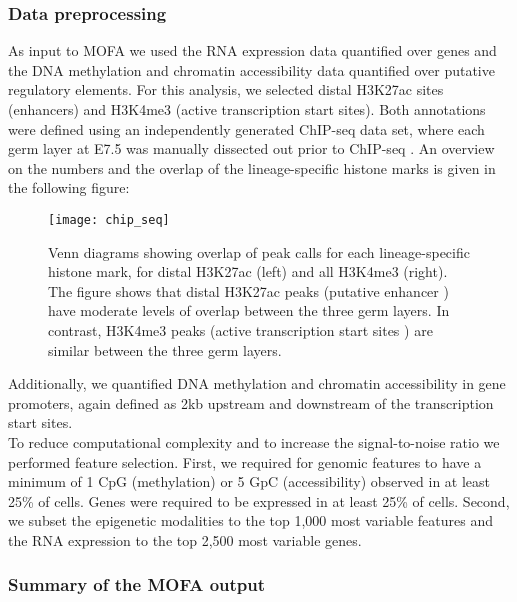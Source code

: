 \subsubsection{Data preprocessing}

As input to MOFA we used the RNA expression data quantified over genes and the DNA methylation and chromatin accessibility data quantified over putative regulatory elements. For this analysis, we selected distal H3K27ac sites (enhancers) and H3K4me3 (active transcription start sites). Both annotations were defined using an independently generated ChIP-seq data set, where each germ layer at E7.5 was manually dissected out prior to ChIP-seq \cite{Xiang2020}. An overview on the numbers and the overlap of the lineage-specific histone marks is given in the following figure:

\begin{figure}[H]
	\texttt{[image: chip\_seq]}
	\caption{
	Venn diagrams showing overlap of peak calls for each lineage-specific histone mark, for distal H3K27ac (left) and all H3K4me3 (right). The figure shows that distal H3K27ac peaks (putative enhancer \cite{Creyghton2010}) have moderate levels of overlap between the three germ layers. In contrast, H3K4me3 peaks (active transcription start sites \cite{Liang2004}) are similar between the three germ layers.
	}
	\label{fig:chip_seq}
\end{figure}

Additionally, we quantified DNA methylation and chromatin accessibility in gene promoters, again defined as 2kb upstream and downstream of the transcription start sites.\\
To reduce computational complexity and to increase the signal-to-noise ratio we performed feature selection. First, we required for genomic features to have a minimum of 1 CpG (methylation) or 5 GpC (accessibility) observed in at least 25\% of cells. Genes were required to be expressed in at least 25\% of cells. Second, we subset the epigenetic modalities to the top 1,000 most variable features and the RNA expression to the top 2,500 most variable genes.

\subsubsection{Summary of the MOFA output}


